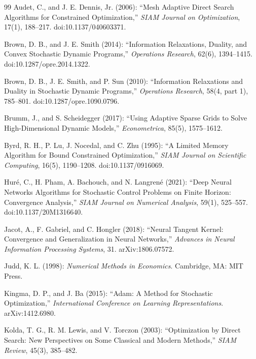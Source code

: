 \begin{thebibliography}{99}
Audet, C., and J. E. Dennis, Jr. (2006): ``Mesh Adaptive Direct Search Algorithms for Constrained Optimization,'' \emph{SIAM Journal on Optimization}, 17(1), 188--217. doi:10.1137/040603371.

Brown, D. B., and J. E. Smith (2014): ``Information Relaxations, Duality, and Convex Stochastic Dynamic Programs,'' \emph{Operations Research}, 62(6), 1394--1415. doi:10.1287/opre.2014.1322.

Brown, D. B., J. E. Smith, and P. Sun (2010): ``Information Relaxations and Duality in Stochastic Dynamic Programs,'' \emph{Operations Research}, 58(4, part 1), 785--801. doi:10.1287/opre.1090.0796.

Brumm, J., and S. Scheidegger (2017): ``Using Adaptive Sparse Grids to Solve High-Dimensional Dynamic Models,'' \emph{Econometrica}, 85(5), 1575--1612.

Byrd, R. H., P. Lu, J. Nocedal, and C. Zhu (1995): ``A Limited Memory Algorithm for Bound Constrained Optimization,'' \emph{SIAM Journal on Scientific Computing}, 16(5), 1190--1208. doi:10.1137/0916069.

Hur\'e, C., H. Pham, A. Bachouch, and N. Langren\'e (2021): ``Deep Neural Networks Algorithms for Stochastic Control Problems on Finite Horizon: Convergence Analysis,'' \emph{SIAM Journal on Numerical Analysis}, 59(1), 525--557. doi:10.1137/20M1316640.

Jacot, A., F. Gabriel, and C. Hongler (2018): ``Neural Tangent Kernel: Convergence and Generalization in Neural Networks,'' \emph{Advances in Neural Information Processing Systems}, 31. arXiv:1806.07572.

Judd, K. L. (1998): \emph{Numerical Methods in Economics}. Cambridge, MA: MIT Press.

Kingma, D. P., and J. Ba (2015): ``Adam: A Method for Stochastic Optimization,'' \emph{International Conference on Learning Representations}. arXiv:1412.6980.

Kolda, T. G., R. M. Lewis, and V. Torczon (2003): ``Optimization by Direct Search: New Perspectives on Some Classical and Modern Methods,'' \emph{SIAM Review}, 45(3), 385--482.


\end{thebibliography}
